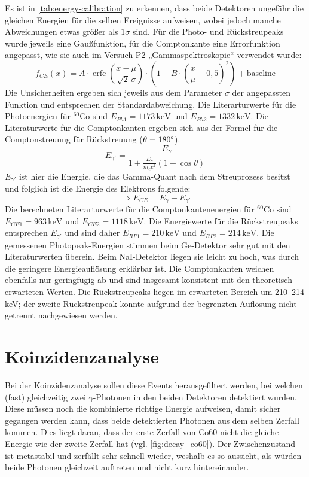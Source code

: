 
Es ist in \autoref{tab:energy-calibration} zu erkennen, dass beide Detektoren ungefähr die gleichen Energien für die selben Ereignisse aufweisen, wobei jedoch manche Abweichungen etwas größer als $1 \sigma$ sind. Für die Photo- und Rückstreupeaks wurde jeweils eine Gaußfunktion, für die Comptonkante eine Errorfunktion angepasst, wie sie auch im Versuch P2 „Gammaspektroskopie“ verwendet wurde:
\[
f_{CE}(x) = A \cdot \operatorname{erfc}\left( \frac{x - \mu}{\sqrt{2} \, \sigma} \right) \cdot \left( 1 + B \cdot \left( \frac{x}{\mu} - 0{,}5 \right)^2 \right) + \text{baseline}
\]
Die Unsicherheiten ergeben sich jeweils aus dem Parameter \(\sigma\) der angepassten Funktion und entsprechen der Standardabweichung. Die Literarturwerte \cite{Ordner} für die Photoenergien für $^{60}$Co sind $E_{Ph1} = 1173\, \text{keV}$ und $E_{Ph2} = 1332\, \text{keV}$. Die Literaturwerte für die Comptonkanten ergeben sich aus der Formel für die Comptonstreuung für Rückstreuung ($\theta = 180\degree$).
\[
E_{\gamma'} = \frac{E_\gamma}{1 + \frac{E_\gamma}{m_e c^2} (1 - \cos\theta)}
\]
$E_{\gamma'}$ ist hier die Energie, die das Gamma-Quant nach dem Streuprozess besitzt und folglich ist die Energie des Elektrons folgende:
\[
\Rightarrow E_{CE} = E_{\gamma} - E_{\gamma'}
\]
Die berechneten Literarturwerte \cite{Ordner} für die Comptonkantenenergien für $^{60}$Co sind $E_{CE1} = 963\, \text{keV}$ und $E_{CE2} = 1118\, \text{keV}$. Die Energiewerte für die Rückstreupeaks entsprechen $E_{\gamma'}$ und sind daher $E_{RP1} = 210\, \text{keV}$ und $E_{RP2} = 214\, \text{keV}$. Die gemessenen Photopeak-Energien stimmen beim Ge-Detektor sehr gut mit den Literaturwerten überein. Beim NaI-Detektor liegen sie leicht zu hoch, was durch die geringere Energieauflösung erklärbar ist. Die Comptonkanten weichen ebenfalls nur geringfügig ab und sind insgesamt konsistent mit den theoretisch erwarteten Werten. Die Rückstreupeaks liegen im erwarteten Bereich um 210–214 keV; der zweite Rückstreupeak konnte aufgrund der begrenzten Auflösung nicht getrennt nachgewiesen werden.

\section{Koinzidenzanalyse}
Bei der Koinzidenzanalyse sollen diese Events herausgefiltert werden, bei welchen (fast) gleichzeitig zwei $\gamma$-Photonen in den beiden Detektoren detektiert wurden. Diese müssen noch die kombinierte richtige Energie aufweisen, damit sicher gegangen werden kann, dass beide detektierten Photonen aus dem selben Zerfall kommen. Dies liegt daran, dass der erste Zerfall von Co60 nicht die gleiche Energie wie der zweite Zerfall hat (vgl. \autoref{fig:decay_co60}). Der Zwischenzustand ist metastabil und zerfällt sehr schnell wieder, weshalb es so aussieht, als würden beide Photonen gleichzeit auftreten und nicht kurz hintereinander.

